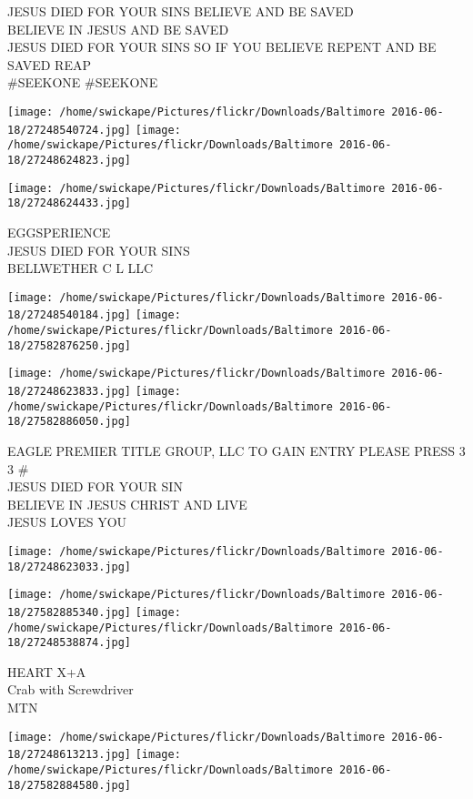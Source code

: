 \documentclass[10pt,letterpaper]{article}
\begin{document}
JESUS DIED FOR YOUR SINS BELIEVE AND BE SAVED\\
BELIEVE IN JESUS AND BE SAVED\\
JESUS DIED FOR YOUR SINS SO IF YOU BELIEVE REPENT AND BE SAVED REAP\\
\#SEEKONE \#SEEKONE
\pagebreak

\texttt{[image: /home/swickape/Pictures/flickr/Downloads/Baltimore 2016-06-18/27248540724.jpg]}
\texttt{[image: /home/swickape/Pictures/flickr/Downloads/Baltimore 2016-06-18/27248624823.jpg]}

\vspace{0.25in}
\texttt{[image: /home/swickape/Pictures/flickr/Downloads/Baltimore 2016-06-18/27248624433.jpg]}

EGGSPERIENCE\\
JESUS DIED FOR YOUR SINS\\
BELLWETHER C L LLC
\pagebreak

\texttt{[image: /home/swickape/Pictures/flickr/Downloads/Baltimore 2016-06-18/27248540184.jpg]}
\texttt{[image: /home/swickape/Pictures/flickr/Downloads/Baltimore 2016-06-18/27582876250.jpg]}

\texttt{[image: /home/swickape/Pictures/flickr/Downloads/Baltimore 2016-06-18/27248623833.jpg]}
\texttt{[image: /home/swickape/Pictures/flickr/Downloads/Baltimore 2016-06-18/27582886050.jpg]}

EAGLE PREMIER TITLE GROUP, LLC TO GAIN ENTRY PLEASE PRESS 3 3 \#\\
JESUS DIED FOR YOUR SIN\\
BELIEVE IN JESUS CHRIST AND LIVE\\
JESUS LOVES YOU
\pagebreak

\texttt{[image: /home/swickape/Pictures/flickr/Downloads/Baltimore 2016-06-18/27248623033.jpg]}

\vspace{0.25in}
\texttt{[image: /home/swickape/Pictures/flickr/Downloads/Baltimore 2016-06-18/27582885340.jpg]}
\texttt{[image: /home/swickape/Pictures/flickr/Downloads/Baltimore 2016-06-18/27248538874.jpg]}

HEART X+A\\
Crab with Screwdriver\\
MTN
\pagebreak

\texttt{[image: /home/swickape/Pictures/flickr/Downloads/Baltimore 2016-06-18/27248613213.jpg]}
\texttt{[image: /home/swickape/Pictures/flickr/Downloads/Baltimore 2016-06-18/27582884580.jpg]}
\end{document}
